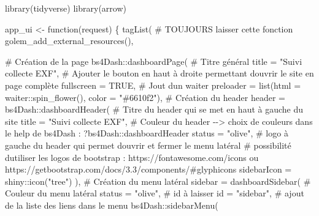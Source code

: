 \documentclass[
  letterpaper,
  DIV=11,
  numbers=noendperiod]{scrreprt}
\newenvironment{Shaded}{\begin{snugshade}}{\end{snugshade}}
\newcommand{\AttributeTok}[1]{\textcolor[rgb]{0.40,0.45,0.13}{#1}}
\newcommand{\CommentTok}[1]{\textcolor[rgb]{0.37,0.37,0.37}{#1}}
\newcommand{\ConstantTok}[1]{\textcolor[rgb]{0.56,0.35,0.01}{#1}}
\newcommand{\ControlFlowTok}[1]{\textcolor[rgb]{0.00,0.23,0.31}{#1}}
\newcommand{\FunctionTok}[1]{\textcolor[rgb]{0.28,0.35,0.67}{#1}}
\newcommand{\NormalTok}[1]{\textcolor[rgb]{0.00,0.23,0.31}{#1}}
\newcommand{\OtherTok}[1]{\textcolor[rgb]{0.00,0.23,0.31}{#1}}
\newcommand{\SpecialCharTok}[1]{\textcolor[rgb]{0.37,0.37,0.37}{#1}}
\newcommand{\StringTok}[1]{\textcolor[rgb]{0.13,0.47,0.30}{#1}}
\begin{document}
\begin{Shaded}
\begin{Highlighting}[]
\FunctionTok{library}\NormalTok{(tidyverse)}
\FunctionTok{library}\NormalTok{(arrow)}

\NormalTok{app\_ui }\OtherTok{\textless{}{-}} \ControlFlowTok{function}\NormalTok{(request) \{}
  \FunctionTok{tagList}\NormalTok{(}
    \CommentTok{\# TOUJOURS laisser cette fonction}
    \FunctionTok{golem\_add\_external\_resources}\NormalTok{(),}
    
    \CommentTok{\# Création de la page}
\NormalTok{    bs4Dash}\SpecialCharTok{::}\FunctionTok{dashboardPage}\NormalTok{(}
      \CommentTok{\# Titre général}
      \AttributeTok{title =} \StringTok{"Suivi collecte EXF"}\NormalTok{,}
      \CommentTok{\# Ajouter le bouton en haut à droite permettant d\textquotesingle{}ouvrir le site en page complète}
      \AttributeTok{fullscreen =} \ConstantTok{TRUE}\NormalTok{,}
      \CommentTok{\# Jout d\textquotesingle{}un waiter}
      \AttributeTok{preloader =} \FunctionTok{list}\NormalTok{(}\AttributeTok{html =}\NormalTok{ waiter}\SpecialCharTok{::}\FunctionTok{spin\_flower}\NormalTok{(), }\AttributeTok{color =} \StringTok{"\#6610f2"}\NormalTok{),}
      \CommentTok{\# Création du header}
      \AttributeTok{header =}\NormalTok{ bs4Dash}\SpecialCharTok{::}\FunctionTok{dashboardHeader}\NormalTok{(}
        \CommentTok{\# Titre du header qui se met en haut à gauche du site}
        \AttributeTok{title =} \StringTok{"Suivi collecte EXF"}\NormalTok{,}
        \CommentTok{\# Couleur du header {-}{-}\textgreater{} choix de couleurs dans le help de bs4Dash : ?bs4Dash::dashboardHeader}
        \AttributeTok{status =} \StringTok{"olive"}\NormalTok{,}
        \CommentTok{\# logo à gauche du header qui permet d\textquotesingle{}ouvrir et fermer le menu latéral}
        \CommentTok{\# possibilité d\textquotesingle{}utiliser les logos de bootstrap : https://fontawesome.com/icons ou https://getbootstrap.com/docs/3.3/components/\#glyphicons}
        \AttributeTok{sidebarIcon =}\NormalTok{ shiny}\SpecialCharTok{::}\FunctionTok{icon}\NormalTok{(}\StringTok{"tree"}\NormalTok{)}
\NormalTok{      ),}
      \CommentTok{\# Création du menu latéral}
      \AttributeTok{sidebar =} \FunctionTok{dashboardSidebar}\NormalTok{(}
        \CommentTok{\# Couleur du menu latéral}
        \AttributeTok{status =} \StringTok{"olive"}\NormalTok{,}
        \CommentTok{\# id à laisser}
        \AttributeTok{id =} \StringTok{"sidebar"}\NormalTok{,}
        \CommentTok{\# ajout de la liste des liens dans le menu}
\NormalTok{        bs4Dash}\SpecialCharTok{::}\FunctionTok{sidebarMenu}\NormalTok{(}

\end{Highlighting}
\end{Shaded}
\end{document}
